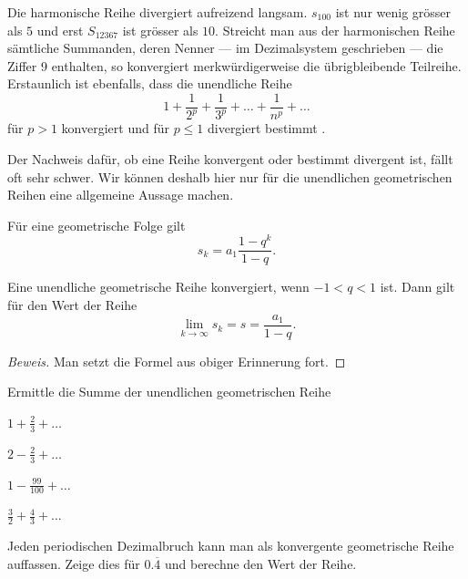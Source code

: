 \documentclass[%
11pt,%
twoside,%
titlepage,%
german,%
headsepline%
]{scrartcl}
\begin{document}
Die harmonische Reihe divergiert aufreizend langsam. $s_{100}$ ist nur wenig gr\"osser als $5$ und erst $S_{12367}$ ist gr\"osser als $10$. Streicht man aus der harmonischen Reihe s\"amtliche Summanden, deren Nenner --- im Dezimalsystem geschrieben --- die Ziffer 9 enthalten, so konvergiert merkw\"urdigerweise die \"ubrigbleibende Teilreihe. Erstaunlich ist ebenfalls, dass die unendliche Reihe
$$1+\frac{1}{2^p}+\frac{1}{3^p}+\dots+\frac{1}{n^p}+\dots$$
f\"ur $p>1$ konvergiert und f\"ur $p\leq1$ divergiert bestimmt .

Der Nachweis daf\"ur, ob eine Reihe konvergent oder bestimmt divergent ist, fällt oft sehr schwer. Wir k\"onnen deshalb hier nur f\"ur die unendlichen geometrischen Reihen eine allgemeine Aussage machen.

\begin{erin}
F\"ur eine geometrische Folge gilt
$$s_k=a_1\frac{1-q^k}{1-q}.$$
\end{erin}

\begin{csatz}{}
Eine unendliche geometrische Reihe konvergiert, wenn $-1<q<1$ ist. Dann gilt f\"ur den Wert der Reihe
$$\lim_{k\to\infty}s_k=s=\frac{a_1}{1-q}.$$
\end{csatz}
\begin{proof}[Beweis]
Man setzt die Formel aus obiger Erinnerung fort.
\end{proof}

\begin{ueb}[Reihen]
Ermittle die Summe der unendlichen geometrischen Reihe

\begin{minipage}{0.23\textwidth}
\begin{enumeratea}
\item $1+\frac{2}{3}+\dots$
\item $2-\frac{2}{3}+\dots$
\end{enumeratea}
\end{minipage}
\begin{minipage}{0.23\textwidth}
\begin{enumeratea}
\addtocounter{enumi}{2}
\item $1-\frac{99}{100}+\dots$
\item $\frac{3}{2}+\frac{4}{3}+\dots$
\end{enumeratea}
\end{minipage}
\end{ueb}

\begin{ueb}[Quartastoff]
Jeden periodischen Dezimalbruch kann man als konvergente geometrische Reihe auffassen. Zeige dies f\"ur $0.\overline{4}$ und berechne den Wert der Reihe.
\end{ueb}
\end{document}
